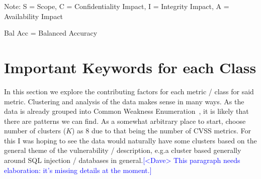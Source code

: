 \documentclass[12pt]{article}
\newcommand{\note}[2][red]{\textcolor{#1}{#2}}
\newcommand{\notedme}[1]{\note[blue]{[<Dave> #1]}}
\begin{document}
\begin{table}[H]
	\centering
	\caption{Comparison of the effects of the pre-trained models on the CVSS v3.1 dataset (Part 2).}
	\label{tab:distil_part2}
	\begin{tablenotes}
		\small
		\item Note: S = Scope, C = Confidentiality Impact, I = Integrity Impact, A = Availability
		Impact
		\item Bal Acc = Balanced Accuracy
	\end{tablenotes}
\end{table}

\section{Important Keywords for each Class}

In this section we explore the contributing factors for each metric / class for said metric.
Clustering and analysis of the data makes sense in many ways. As the data is already grouped into
Common Weakness Enumeration~\cite{CWE}, it is likely that there are patterns we can
find. As a somewhat arbitrary place to start, choose number of clusters ($K$) as 8 due to that being the number of CVSS
metrics. For this I was hoping to see the data would naturally have some clusters based on the
general theme of the vulnerability / description, e.g.\@ a cluster based generally around SQL
injection / databases in general.\notedme{This paragraph needs elaboration: it's missing details at
	the moment.}
\end{document}

